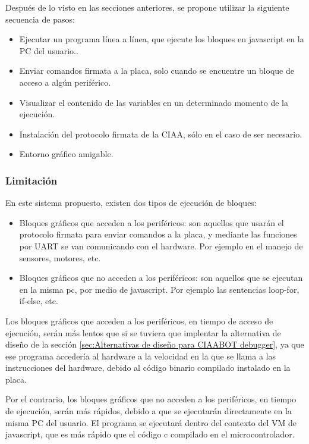 Después de lo visto en las secciones anteriores, se propone utilizar la siguiente secuencia de pasos:

\begin{itemize}
	\item Ejecutar un programa línea a línea, que ejecute los bloques en javascript en la PC del usuario..	
	\item Enviar comandos firmata a la placa, solo cuando se encuentre un bloque de acceso a algún periférico.
	\item Visualizar el contenido de las variables en un determinado momento de la ejecución.
	\item Instalación del protocolo firmata de la CIAA, sólo en el caso de ser necesario.
	\item Entorno gráfico amigable.
\end{itemize}

\subsubsection{Limitación}
\label{subsec:Limitación}

En este sistema propuesto, existen dos tipos de ejecución de bloques:

\begin{itemize}
	\item Bloques gráficos que acceden a los periféricos: son aquellos que usarán el protocolo firmata para enviar comandos a la placa, y mediante las funciones por UART se van comunicando con el hardware. Por ejemplo en el manejo de sensores, motores, etc.
	\item Bloques gráficos que no acceden a los periféricos: son aquellos que se ejecutan en la misma pc, por medio de javascript. Por ejemplo las sentencias loop-for, if-else, etc.
\end{itemize}

Los bloques gráficos que acceden a los periféricos, en tiempo de acceso de ejecución,
serán más lentos que si se tuviera que implentar la alternativa de diseño de
la sección \ref{sec:Alternativas de diseño para CIAABOT debugger}, ya que ese programa accedería al hardware a la velocidad en la que
se llama a las instrucciones del hardware, debido al código binario compilado
instalado en la placa.

Por el contrario, los bloques gráficos que no acceden a los periféricos, en tiempo
de ejecución, serán más rápidos, debido a que se ejecutarán directamente en la
misma PC del usuario. El programa se ejecutará dentro del contexto del VM de
javascript, que es más rápido que el código c compilado en el microcontrolador.

